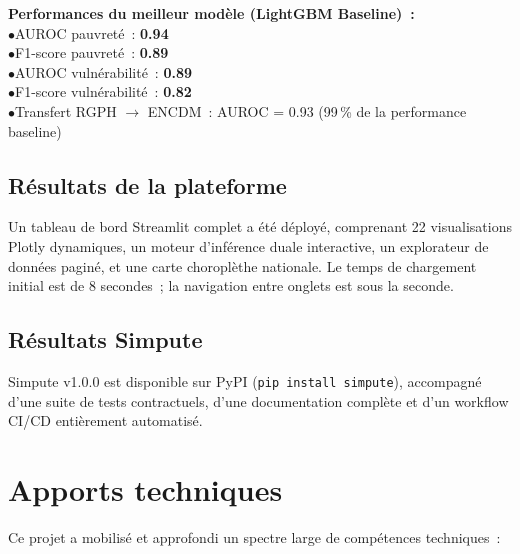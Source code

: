 \documentclass[12pt,a4paper]{report}
\begin{document}
\begin{resultbox}
\textbf{Performances du meilleur modèle (LightGBM Baseline)~:}\\[4pt]
$\bullet$\quad AUROC pauvreté~: \textbf{0.94}\\
$\bullet$\quad F1-score pauvreté~: \textbf{0.89}\\
$\bullet$\quad AUROC vulnérabilité~: \textbf{0.89}\\
$\bullet$\quad F1-score vulnérabilité~: \textbf{0.82}\\
$\bullet$\quad Transfert RGPH $\to$ ENCDM~: AUROC = 0.93 (99\,\% de la performance baseline)
\end{resultbox}

\subsection{Résultats de la plateforme}

Un tableau de bord Streamlit complet a été déployé, comprenant 22 visualisations Plotly dynamiques, un moteur d'inférence duale interactive, un explorateur de données paginé, et une carte choroplèthe nationale. Le temps de chargement initial est de 8 secondes~; la navigation entre onglets est sous la seconde.

\subsection{Résultats Simpute}

Simpute v1.0.0 est disponible sur PyPI (\texttt{pip install simpute}), accompagné d'une suite de tests contractuels, d'une documentation complète et d'un workflow CI/CD entièrement automatisé.

\section{Apports techniques}

Ce projet a mobilisé et approfondi un spectre large de compétences techniques~:
\end{document}

